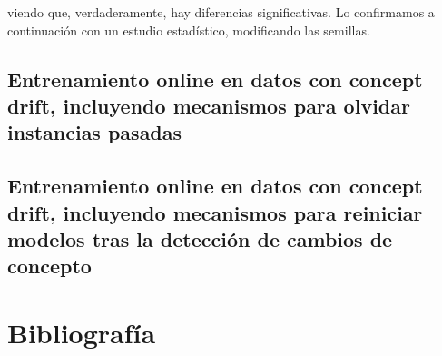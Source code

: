 viendo que, verdaderamente, hay diferencias significativas. Lo confirmamos a continuación con un estudio estadístico, modificando las semillas.



\subsection{Entrenamiento online en datos con concept drift, incluyendo mecanismos para olvidar instancias pasadas}

\subsection{Entrenamiento online en datos con concept drift, incluyendo mecanismos para reiniciar modelos tras la detección de cambios de concepto}




\newpage
\section{Bibliografía}




